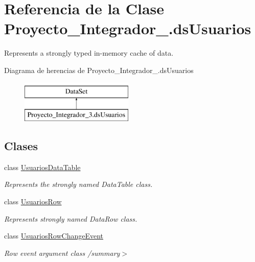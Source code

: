 \hypertarget{class_proyecto___integrador__3_1_1ds_usuarios}{\section{Referencia de la Clase Proyecto\-\_\-\-Integrador\-\_.\-ds\-Usuarios}
\label{class_proyecto___integrador__3_1_1ds_usuarios}
}


Represents a strongly typed in-\/memory cache of data.  


Diagrama de herencias de Proyecto\-\_\-\-Integrador\-\_.\-ds\-Usuarios\begin{figure}[H]
\begin{center}
\leavevmode
\includegraphics[height=2.000000cm]{class_proyecto___integrador__3_1_1ds_usuarios}
\end{center}
\end{figure}
\subsection*{Clases}
\begin{DoxyCompactItemize}
\item 
class \hyperlink{class_proyecto___integrador__3_1_1ds_usuarios_1_1_usuarios_data_table}{Usuarios\-Data\-Table}
\begin{DoxyCompactList}\small\item\em Represents the strongly named Data\-Table class. \end{DoxyCompactList}\item 
class \hyperlink{class_proyecto___integrador__3_1_1ds_usuarios_1_1_usuarios_row}{Usuarios\-Row}
\begin{DoxyCompactList}\small\item\em Represents strongly named Data\-Row class. \end{DoxyCompactList}\item 
class \hyperlink{class_proyecto___integrador__3_1_1ds_usuarios_1_1_usuarios_row_change_event}{Usuarios\-Row\-Change\-Event}
\begin{DoxyCompactList}\small\item\em Row event argument class /summary$>$ \end{DoxyCompactList}\end{DoxyCompactItemize}
